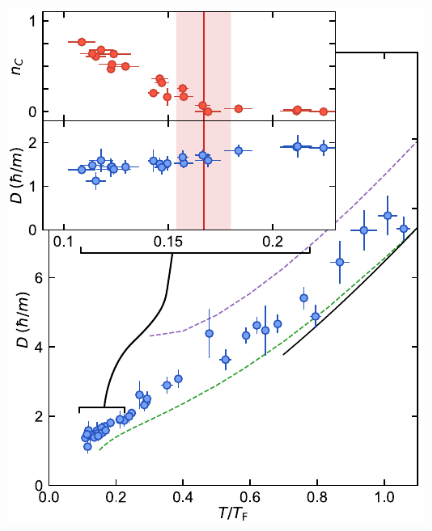 \documentclass[26pt, paperwidth=36in,paperheight=48in]{tikzposter} %
\begin{document}
\begin{columns}
{\begin{minipage}{0.3\textwidth}
		\includegraphics[width=11cm]{figures/sound_diffusivity.pdf}
	\end{minipage}
	\vspace{0.5cm}
	
	
}

	
	
	


\end{columns}



\end{document}
